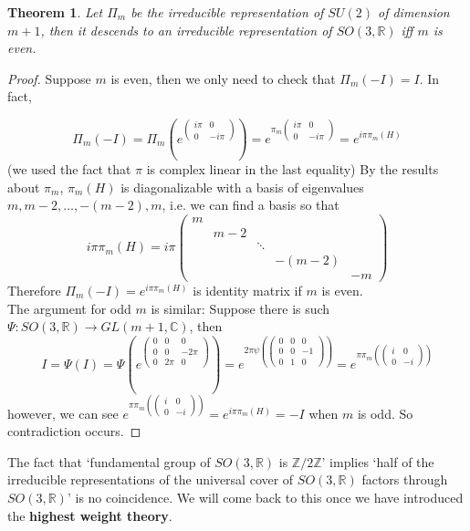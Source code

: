 \documentclass[11pt]{article}
\newtheorem{theorem}{Theorem}[section]
\newcommand{\bb}[1]{\mathbb{#1}}
\begin{document}
\begin{theorem}
Let $\Pi_m$ be the irreducible representation of $SU(2)$ of dimension $m+1$, then it descends to an irreducible representation of $SO(3,\bb{R})$ iff $m$ is even.
\end{theorem}
\begin{proof}
Suppose $m$ is even, then we only need to check that $\Pi_m(- I) = I$. In fact,

$$\Pi_m(-I) = \Pi_m(e^{\left( \begin{array}{cc}
i\pi & 0 \\
0 & -i\pi \end{array} \right)}) = e^{\pi_m\left( \begin{array}{cc}
i\pi & 0 \\
0 & -i\pi \end{array} \right)} = e^{i\pi \pi_m(H)}$$
(we used the fact that $\pi$ is complex linear in the last equality)
By the results about $\pi_m$, $\pi_m(H)$ is diagonalizable with a basis of eigenvalues $m, m-2, \dots, -(m-2),m$, i.e. we can find a basis so that
$$i\pi \pi_m(H) = i\pi \left( \begin{array}{ccccc}
m & & & & \\
 & m-2 & & &\\
  & & \ddots & & \\
  & & & -(m-2) & \\
  & & & & -m \end{array} \right)$$
Therefore $\Pi_m(-I) = e^{i\pi \pi_m(H)}$ is identity matrix if $m$ is even.\\
The argument for odd $m$ is similar: Suppose there is such $\Psi : SO(3,\bb{R}) \to GL(m+1,\bb{C})$, then
$$I = \Psi(I)= \Psi(e^{\left( \begin{array}{ccc}
0 & 0 & 0 \\
0& 0& -2\pi\\
0 & 2\pi & 0 \end{array} \right)}) = e^{2\pi \psi(\left( \begin{array}{ccc}
0 & 0 & 0 \\
0& 0& -1\\
0 & 1 & 0 \end{array} \right))} = e^{\pi \pi_m(\left( \begin{array}{cc}
 i & 0\\
0 & -i \end{array} \right))}$$
however, we can see $e^{\pi \pi_m(\left( \begin{array}{cc}
 i & 0\\
0 & -i \end{array} \right))} = e^{i\pi\pi_m(H)} = -I$ when $m$ is odd. So contradiction occurs.
\end{proof}
The fact that `fundamental group of $SO(3,\bb{R})$ is $\bb{Z}/2\bb{Z}$' implies `half of the irreducible representations of the universal cover of $SO(3,\bb{R})$ factors through $SO(3,\bb{R})$' is no coincidence. We will come back to this once we have introduced the \textbf{highest weight theory}.
\end{document}
